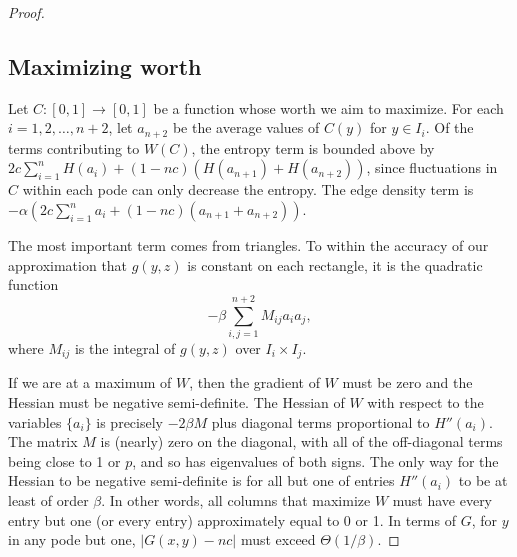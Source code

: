 \documentclass[12pt]{amsart}
\newcommand\be{\begin{equation}}
\newcommand\ee{\end{equation}}
\newcommand{\Value}{worth}
\begin{document}
{\begin{proof}
\subsection{Maximizing \Value}

Let $C: [0,1] \to [0,1]$ be a function whose \Value{} we aim to 
maximize. For each $i=1,2,\ldots, n+2$,
let $a_{n+2}$ be the average values of $C(y)$ for $y \in I_i$. Of the terms contributing to 
$W(C)$, the entropy term is bounded above by $2c \sum_{i=1}^n H(a_i) + (1-nc) (H(a_{n+1}) 
+ H(a_{n+2}))$, since fluctuations in $C$ within each pode can only decrease the entropy. 
The edge density term is $-\alpha (2c \sum_{i=1}^n a_i + (1-nc) (a_{n+1}+a_{n+2}))$. 

The most important term comes from triangles. To within the accuracy of our approximation
that $g(y,z)$ is constant on each rectangle, it is the quadratic function 
\be - \beta \sum_{i,j=1}^{n+2} M_{ij} a_i a_j, \ee
where $M_{ij}$ is the integral of $g(y,z)$ over $I_{i} \times I_j$.

If we are at a maximum of $W$, then the gradient of $W$ must be zero and the Hessian must be 
negative semi-definite. The Hessian of $W$ with respect to the variables $\{a_i\}$ 
is precisely $-2\beta M$ plus diagonal 
terms proportional to $H''(a_i)$.
The matrix $M$ is (nearly) zero on the diagonal, with all of the off-diagonal terms being close to 1
or $p$, and so has eigenvalues of both signs. The only way for the Hessian to be negative semi-definite 
is for all but one of entries $H''(a_i)$ to be at least of order $\beta$. In other words, all columns 
that maximize $W$ must have every entry but one (or every entry) 
approximately equal to 0 or 1. In terms 
of $G$, for $y$ in any pode but one, $|G(x,y) -nc|$ must exceed 
$\Theta(1/\beta)$. 


\end{proof}}
\end{document}
